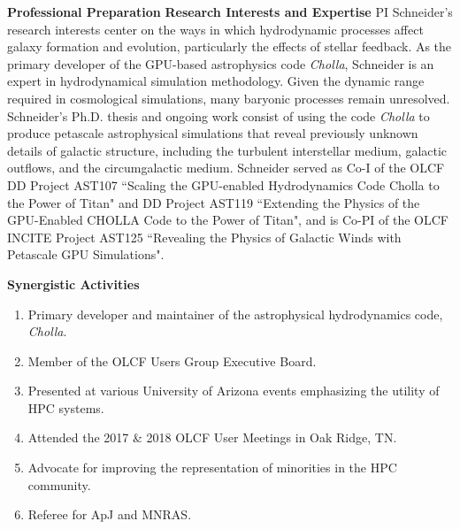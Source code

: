 \documentclass[11pt,letterpaper,english]{article}
\begin{document}
\begin{flushleft} {\bf Professional Preparation}
\vspace{-6pt}
{\bf Research Interests and Expertise}
{\parindent 16pt
PI Schneider's research interests center on the ways in which hydrodynamic processes affect galaxy formation and evolution, particularly the effects of stellar feedback. As the primary developer of the GPU-based astrophysics code \textit{Cholla}, Schneider is an expert in hydrodynamical simulation methodology. Given the dynamic range required in cosmological simulations, many baryonic processes remain unresolved. Schneider's Ph.D. thesis and ongoing work consist of using the code \textit{Cholla} to produce petascale astrophysical simulations that reveal previously unknown details of galactic structure, including the turbulent interstellar medium, galactic outflows, and the circumgalactic medium. Schneider served as Co-I of the OLCF DD Project AST107 ``Scaling the GPU-enabled Hydrodynamics Code Cholla to the Power of Titan" and DD Project AST119 ``Extending the Physics of the GPU-Enabled CHOLLA Code to the Power of Titan", and is Co-PI of the OLCF INCITE Project AST125 ``Revealing the Physics of Galactic Winds with Petascale GPU Simulations".
}

\vspace{.04in}
{\bf Synergistic Activities}
\vspace{-6pt}
\begin{enumerate} \itemsep1pt \parskip0pt 
\item Primary developer and maintainer of the astrophysical hydrodynamics code, \textit{Cholla}. \\ 
\item Member of the OLCF Users Group Executive Board. \\
\item Presented at various University of Arizona events emphasizing the utility of HPC systems. \\ 
\item Attended the 2017 \& 2018 OLCF User Meetings in Oak Ridge, TN. \\ 
\item Advocate for improving the representation of minorities in the HPC community. \\
\item Referee for ApJ and MNRAS. \\
\end{enumerate} 


\end{flushleft}
\end{document}
